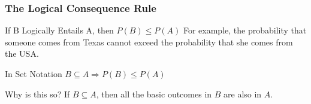 \begin{frame}
\frametitle{The Logical Consequence Rule}

\begin{block}{If B Logically Entails A, then $P(B)\leq P(A)$}
  For example, the probability that someone comes from Texas cannot exceed the probability that she comes from the USA. 
\end{block}


\begin{alertblock}{In Set Notation}
  $B\subseteq A \Rightarrow P(B)\leq P(A)$
\end{alertblock}


\begin{block}{Why is this so?}
If $B \subseteq A$, then all the basic outcomes in $B$ are also in $A$.
\end{block}

\end{frame}

